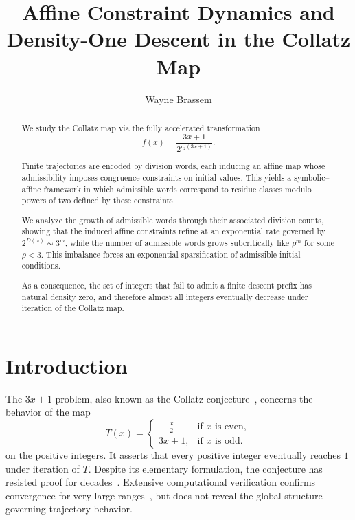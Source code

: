 \documentclass[12pt, oneside]{article}
\title{Affine Constraint Dynamics and Density-One Descent in the Collatz Map}
\author{Wayne Brassem}
\numberwithin{equation}{section}
\theoremstyle{definition}
\theoremstyle{plain}
\theoremstyle{remark}
\begin{document}


\maketitle

\begin{abstract}

We study the Collatz map via the fully accelerated transformation
\[
f(x)=\frac{3x+1}{2^{v_2(3x+1)}}.
\]

Finite trajectories are encoded by division words, each inducing an affine map
whose admissibility imposes congruence constraints on initial values. This
yields a symbolic–affine framework in which admissible words correspond to
residue classes modulo powers of two defined by these constraints.

We analyze the growth of admissible words through their associated division
counts, showing that the induced affine constraints refine at an exponential
rate governed by $2^{D(\omega)} \sim 3^m$, while the number of admissible words
grows subcritically like $\rho^m$ for some $\rho < 3$. This imbalance forces
an exponential sparsification of admissible initial conditions.

As a consequence, the set of integers that fail to admit a finite descent prefix
has natural density zero, and therefore almost all integers eventually decrease
under iteration of the Collatz map.

\end{abstract}

\newpage
\tableofcontents

\newpage
\section{Introduction}

The $3x+1$ problem, also known as the Collatz conjecture~\cite{Collatz1937}, concerns
the behavior of the map
\[
T(x) =
\begin{cases}
\displaystyle
    \phantom{3x} \frac{x}{2} & \text {if } x \text{ is even}, \\[8pt]
\displaystyle
    3x+1,                    & \text{if $x$ is odd}.
\end{cases}
\]
on the positive integers. It asserts that every positive integer eventually reaches $1$
under iteration of $T$. Despite its elementary formulation, the conjecture has resisted
proof for decades~\cite{Lagarias2010,Terras1976}. Extensive computational verification
confirms convergence for very large ranges~\cite{OliveiraESilva2010}, but does not
reveal the global structure governing trajectory behavior.
\end{document}
